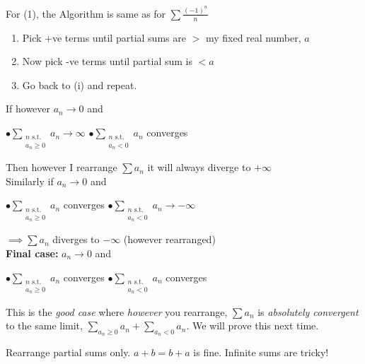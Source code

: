 \documentclass[10pt,twoside]{scrartcl}
\begin{document}
 For (1), the Algorithm is same as for $\sum \frac{(-1)^n}{n}$	
 \begin{enumerate}
 \item Pick +ve terms until partial sums are $>$ my fixed real number, $a$
 \item Now pick -ve terms until partial sum is $< a$
 \item Go back to (i) and repeat.
 \end{enumerate}\vspace*{5pt}
 
 If however $a_n \to 0$ and \vspace*{5pt}
 
   $\bullet \displaystyle{\sum_{\substack{n \text{ s.t.} \\a_n \geq 0}} a_n} \to \infty$\quad 
 $\bullet \displaystyle{\sum_{\substack{n \text{ s.t.}\\ a_n < 0}}  a_n}$ converges
 
 Then however I rearrange $\sum a_n$ it will always diverge to $+ \infty$~\\
 
 Similarly if $a_n \to 0$ and \vspace*{5pt}
 
 	$\bullet \displaystyle{\sum_{\substack{n \text{ s.t.} \\a_n \geq 0}} a_n}$ converges
 \quad $\bullet \displaystyle{\sum_{\substack{n \text{ s.t.}\\ a_n < 0}}  a_n} \to -\infty$ 
 
 $\implies  \sum a_n$ diverges to $-\infty$ (however rearranged)\\

\textbf{ Final case:} $a_n \to 0$ and 

 	$\bullet \displaystyle{\sum_{\substack{n \text{ s.t.} \\a_n \geq 0}} a_n}$ converges
 \quad $\bullet \displaystyle{\sum_{\substack{n \text{ s.t.}\\ a_n < 0}}  a_n}$ converges

This is the \emph{good case} where \emph{however} you rearrange, $\sum a_n$ is \emph{absolutely convergent} to the same limit, $\sum_{a_n \geq 0} a_n + \sum_{a_n < 0} a_n$. 
We will prove this next time.\\

\begin{remark} Rearrange partial sums only. $a+ b = b+a$ is fine. Infinite sums are tricky!	
\end{remark}\vspace*{5pt}
\end{document}
